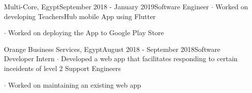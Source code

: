 \begin{verbose}{Multi-Core, Egypt}{September 2018 - January 2019}{Software Engineer}
    \noindent $\cdot$ Worked on developing TeachersHub mobile App using Flutter

    \noindent $\cdot$ Worked on deploying the App to Google Play Store
\end{verbose}

\vspace{3mm}

\begin{verbose}{Orange Business Services, Egypt}{August 2018 - September 2018}{Software Developer Intern}
    \noindent $\cdot$ Developed a web app that facilitates responding to certain inceidents of level 2 Support Engineers

    \noindent $\cdot$ Worked on maintaining an existing web app
\end{verbose}

